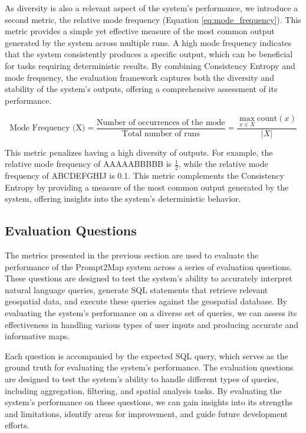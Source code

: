 As diversity is also a relevant aspect of the system's performance, we introduce a second metric, the relative mode frequency (Equation \ref{eq:mode_frequency}). This metric provides a simple yet effective measure of the most common output generated by the system across multiple runs. A high mode frequency indicates that the system consistently produces a specific output, which can be beneficial for tasks requiring deterministic results. By combining Consistency Entropy and mode frequency, the evaluation framework captures both the diversity and stability of the system's outputs, offering a comprehensive assessment of its performance.

\begin{equation}
    \text{Mode Frequency (X)} = \frac{\text{Number of occurrences of the mode}}{\text{Total number of runs}} = \frac{\max_{x \in X} \text{count}(x)}{|X|}
    \label{eq:mode_frequency}
\end{equation}


This metric penalizes having a high diversity of outputs. For example, the relative mode frequency of AAAAABBBBB is $\frac{1}{2}$, while the relative mode frequency of ABCDEFGHIJ is 0.1. This metric complements the Consistency Entropy by providing a measure of the most common output generated by the system, offering insights into the system's deterministic behavior.


\subsection{Evaluation Questions}

The metrics presented in the previous section are used to evaluate the performance of the Prompt2Map system across a series of evaluation questions. These questions are designed to test the system's ability to accurately interpret natural language queries, generate SQL statements that retrieve relevant geospatial data, and execute these queries against the geospatial database. By evaluating the system's performance on a diverse set of queries, we can assess its effectiveness in handling various types of user inputs and producing accurate and informative maps.

Each question is accompanied by the expected SQL query, which serves as the ground truth for evaluating the system's performance. The evaluation questions are designed to test the system's ability to handle different types of queries, including aggregation, filtering, and spatial analysis tasks. By evaluating the system's performance on these questions, we can gain insights into its strengths and limitations, identify areas for improvement, and guide future development efforts.

